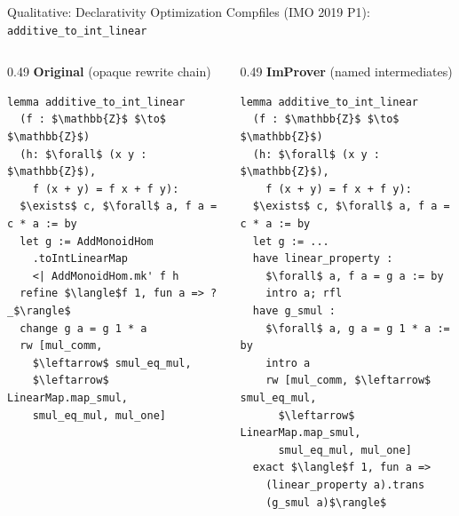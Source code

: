\documentclass{beamer}
\begin{document}
\begin{frame}[fragile]{Qualitative: Declarativity Optimization}
\vspace{0.3em}
{\small Compfiles (IMO 2019 P1): \texttt{additive\_to\_int\_linear}}
\begin{columns}[T]
\begin{column}{0.49\textwidth}
\textbf{Original} (opaque rewrite chain)
\begin{lstlisting}[basicstyle=\tiny\ttfamily]
lemma additive_to_int_linear
  (f : $\mathbb{Z}$ $\to$ $\mathbb{Z}$)
  (h: $\forall$ (x y : $\mathbb{Z}$),
    f (x + y) = f x + f y):
  $\exists$ c, $\forall$ a, f a = c * a := by
  let g := AddMonoidHom
    .toIntLinearMap
    <| AddMonoidHom.mk' f h
  refine $\langle$f 1, fun a => ?_$\rangle$
  change g a = g 1 * a
  rw [mul_comm,
    $\leftarrow$ smul_eq_mul,
    $\leftarrow$ LinearMap.map_smul,
    smul_eq_mul, mul_one]
\end{lstlisting}
\end{column}
\begin{column}{0.49\textwidth}
\textbf{ImProver} (named intermediates)
\begin{lstlisting}[basicstyle=\tiny\ttfamily]
lemma additive_to_int_linear
  (f : $\mathbb{Z}$ $\to$ $\mathbb{Z}$)
  (h: $\forall$ (x y : $\mathbb{Z}$),
    f (x + y) = f x + f y):
  $\exists$ c, $\forall$ a, f a = c * a := by
  let g := ...
  have linear_property :
    $\forall$ a, f a = g a := by
    intro a; rfl
  have g_smul :
    $\forall$ a, g a = g 1 * a := by
    intro a
    rw [mul_comm, $\leftarrow$ smul_eq_mul,
      $\leftarrow$ LinearMap.map_smul,
      smul_eq_mul, mul_one]
  exact $\langle$f 1, fun a =>
    (linear_property a).trans
    (g_smul a)$\rangle$
\end{lstlisting}
\end{column}
\end{columns}
\end{frame}
\end{document}
